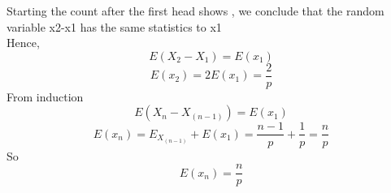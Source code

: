 \documentclass{beamer}
\begin{document}
\begin{frame}
Starting the count after the first head shows , we conclude that the random variable x2-x1 has the same statistics to x1\\ Hence,
\begin{equation}
    E(X_{2}-X_{1})=E(x_{1})
\end{equation}
\begin{equation}
    E(x_{2})=2E(x_{1})=\frac{2}{p}
\end{equation}
From induction
\begin{equation}
    E(X_{n}-X_{(n-1)})=E(x_{1})
\end{equation}
\begin{equation}
    E(x_{n})=E_{X_{(n-1)}} +E(x_{1})=\frac{n-1}{p} + \frac{1}{p}=\frac{n}{p}
\end{equation}
So
\begin{equation}
     E(x_{n})=\frac{n}{p}
\end{equation}

\end{frame}
\end{document}
